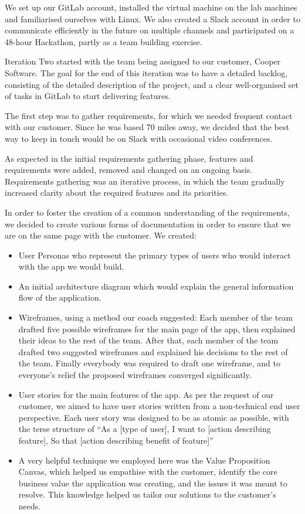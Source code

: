 \documentclass{l3proj}
\begin{document}
We set up our GitLab account, installed the virtual machine on the lab machines and familiarised ourselves with Linux.
We also created a Slack account in order to communicate efficiently in the future on multiple channels and participated on a 48-hour Hackathon, partly as a team building exercise.  

Iteration Two started with the team being assigned to our customer, Cooper Software. The goal for the end of this iteration was to have a detailed backlog, consisting of the detailed description of the project, and a clear well-organised set of tasks in GitLab to start delivering features.

The first step was to gather requirements, for which we needed frequent contact with our customer. Since he was based 70 miles away, we decided that the best way to keep in touch would be on Slack with occasional video conferences.

As expected in the initial requirements gathering phase, features and requirements were added, removed and changed on an ongoing basis. Requirements gathering was an iterative process, in which the team gradually increased clarity about the required features and its priorities.

In order to foster the creation of a common understanding of the requirements, we decided to create various forms of documentation in order to ensure that we are on the same page with the customer. We created:
\begin{itemize}
\item User Personas who represent the primary types of users who would interact with the app we would build.
\item An initial architecture diagram which would explain the general information flow of the application.
\item Wireframes, using a method our coach suggested: 
Each member of the team drafted five possible wireframes for the main page of the app, then explained their ideas to the rest of the team. After that, each member of the team drafted two suggested wireframes and explained his decisions to the rest of the team.
Finally everybody was required to draft one wireframe, and to everyone’s relief the proposed wireframes converged significantly.
\item User stories for the main features of the app. As per the request of our customer, we aimed to have user stories written from a non-technical end user perspective. Each user story was designed to be as atomic as possible, with the terse structure of ``As a [type of user], I want to [action  describing  feature], So that [action  describing  benefit  of  feature]''
\item A very helpful technique we employed here was the Value Proposition Canvas, which helped us empathise with the customer, identify the core business value the application was creating, and the issues it was meant to resolve. This knowledge helped us tailor our solutions to the customer’s needs.
\end{itemize}
\end{document}
